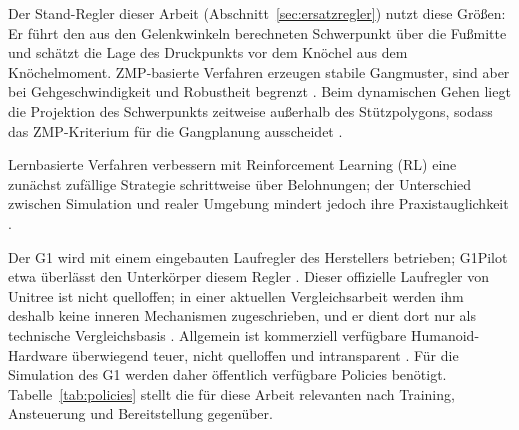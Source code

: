 Der Stand-Regler dieser Arbeit (Abschnitt~\ref{sec:ersatzregler}) nutzt diese Größen: Er führt den aus den Gelenkwinkeln berechneten Schwerpunkt über die Fußmitte und schätzt die Lage des Druckpunkts vor dem Knöchel aus dem Knöchelmoment.
ZMP-basierte Verfahren erzeugen stabile Gangmuster, sind aber bei Gehgeschwindigkeit und Robustheit begrenzt \cite{Tong2024}.
Beim dynamischen Gehen liegt die Projektion des Schwerpunkts zeitweise außerhalb des Stützpolygons, sodass das ZMP-Kriterium für die Gangplanung ausscheidet \cite{Westervelt2018}.

Lernbasierte Verfahren verbessern mit Reinforcement Learning (RL) eine zunächst zufällige Strategie schrittweise über Belohnungen; der Unterschied zwischen Simulation und realer Umgebung mindert jedoch ihre Praxistauglichkeit \cite{Tong2024}.

Der G1 wird mit einem eingebauten Laufregler des Herstellers betrieben; G1Pilot etwa überlässt den Unterkörper diesem Regler \cite{HucebotG1Pilot}.
Dieser offizielle Laufregler von Unitree \cite{Hu2026} ist nicht quelloffen; in einer aktuellen Vergleichsarbeit werden ihm deshalb keine inneren Mechanismen zugeschrieben, und er dient dort nur als technische Vergleichsbasis \cite{Hu2026}.
Allgemein ist kommerziell verfügbare Humanoid-Hardware überwiegend teuer, nicht quelloffen und intransparent \cite{Chi2025}.
Für die Simulation des G1 werden daher öffentlich verfügbare Policies benötigt.
Tabelle~\ref{tab:policies} stellt die für diese Arbeit relevanten nach Training, Ansteuerung und Bereitstellung gegenüber.

